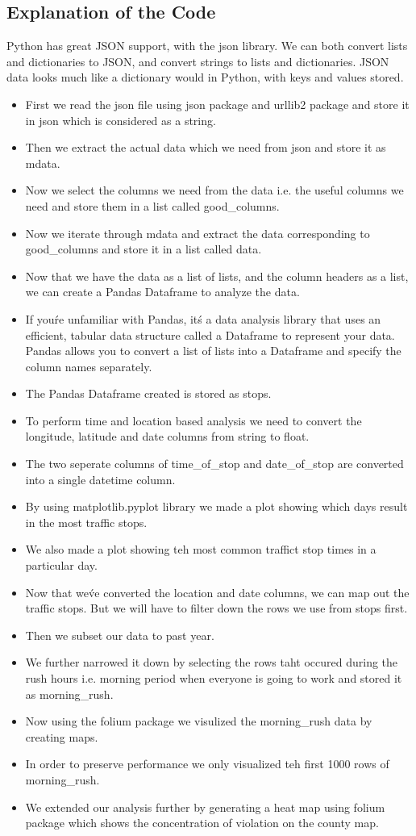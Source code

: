 \documentclass[11pt,oneside]{article}
\begin{document}
\subsection{Explanation of the Code}
{\color{black}
Python has great JSON support, with the json library. We can both convert lists and dictionaries to JSON, and convert strings to lists and dictionaries. JSON data looks much like a dictionary would in Python, with keys and values stored.
\begin{itemize}
	\item First we read the json file using json package and urllib2 package and store it in json which is considered as a string.
	\item Then we extract the actual data which we need from json and store it as mdata.
    	\item  Now we select the columns we need from the data i.e. the useful columns we need and store them in a list called good\_columns.
	\item Now we iterate through mdata and extract the data corresponding to good\_columns and store it in a list called data. 
	\item Now that we have the data as a list of lists, and the column headers as a list, we can create a Pandas Dataframe to analyze the data.
   	\item If you\'re unfamiliar with Pandas, it\'s a data analysis library that uses an efficient, tabular data structure called a Dataframe to represent your data. Pandas allows you to convert a list of lists into a Dataframe and specify the column names separately.
    	\item The Pandas Dataframe created is stored as stops.
   	\item To perform time and location based analysis we need to convert the longitude, latitude and date columns from string to float.
  	\item The two seperate columns of time\_of\_stop and date\_of\_stop are converted into a single datetime column.
    	\item By using matplotlib.pyplot library we made a plot showing which days result in the most traffic stops.
    	\item We also made a plot showing teh most common traffict stop times in a particular day.
    	\item Now that we\'ve converted the location and date columns, we can map out the traffic stops. But we will have to filter down the rows we use from stops first.
    	\item Then we subset our data to past year.
    	\item We further narrowed it down by selecting the rows taht occured during the rush hours i.e. morning period when everyone is going to work and stored it as morning\_rush.
    	\item Now using the folium package we visulized the morning\_rush data by creating maps.
    	\item In order to preserve performance we only visualized teh first 1000 rows of morning\_rush.
    	\item We extended our analysis further by generating a heat map using folium package which shows the concentration of violation on the county map.
    

\end{itemize}}
\end{document}

